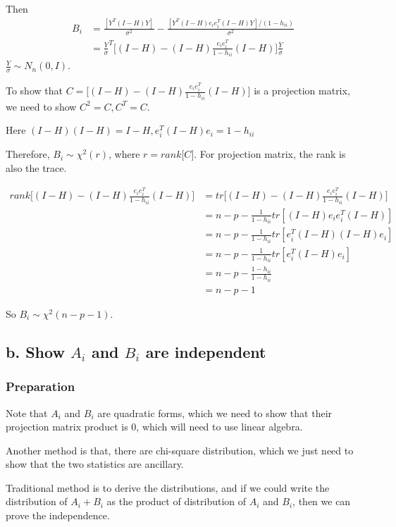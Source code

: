 Then
\begin{align*}
	B_i &= \frac{[Y^T (I-H)Y]}{\sigma^2} -   \frac{[ Y^T (I-H) e_i e_i^T (I-H)Y]/(1- h_{ii})}{\sigma^2} \\
	&= \frac{Y}{\sigma}^T \Big[(I-H) - (I-H) \frac{e_i e_i^T }{1- h_{ii}} (I-H)\Big] \frac{Y}{\sigma}
\end{align*}
$\frac{Y}{\sigma} \sim N_n(0, I)$. 

To show that $C = \Big[(I-H) - (I-H) \frac{e_i e_i^T }{1- h_{ii}} (I-H)\Big]  $ is a projection matrix, we need to show $C^2 = C, C^T= C$.

Here $(I-H)(I-H) = I-H, e_i^T (I-H) e_i = 1- h_{ii}$ 

Therefore, $B_i \sim \chi^2(r)$, where $r = rank \Big[C \Big]$. For projection matrix, the rank is also the trace.

\begin{align*}
	rank \Big[(I-H) - (I-H) \frac{e_i e_i^T }{1- h_{ii}} (I-H)\Big] &= tr \Big[(I-H) - (I-H) \frac{e_i e_i^T }{1- h_{ii}} (I-H)\Big]  \\
	&= n-p - \frac{1}{1-h_{ii}} tr[(I-H) e_i e_i^T (I-H)] \\
	&= n-p -  \frac{1}{1-h_{ii}} tr[e_i^T (I-H) (I-H) e_i ] \\
	&= n-p -  \frac{1}{1-h_{ii}} tr[e_i^T (I-H)  e_i ] \\
	&= n-p -  \frac{1-h_{ii}}{1-h_{ii}} \\
	&= n-p-1
\end{align*}

So $B_i \sim \chi^2(n-p-1)$.

\subsection{b. Show $A_i$ and $B_i$ are independent}

\subsubsection{Preparation}
Note that $A_i$ and $B_i$ are quadratic forms, which we need to show that their projection matrix product is 0, which will need to use linear algebra.

Another method is that, there are chi-square distribution, which we just need to show that the two statistics are ancillary.

Traditional method is to derive the distributions, and if we could write the distribution of $A_i + B_i$ as the product of distribution of $A_i$ and $B_i$, then we can prove the independence. 


